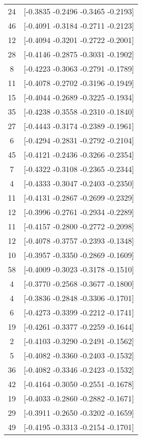 \documentclass[12pt, fullpage,letterpaper]{article}
\begin{document}
\begin{enumerate}
\begin{enumerate}
{\begin{longtable}{|c|c|}
			 24 &  [-0.3835 -0.2496 -0.3465 -0.2193] \\
			 46 &  [-0.4091 -0.3184 -0.2711 -0.2123] \\
			 12 &  [-0.4094 -0.3201 -0.2722 -0.2001] \\
			 28 &  [-0.4146 -0.2875 -0.3031 -0.1902] \\
			  8 &  [-0.4223 -0.3063 -0.2791 -0.1789] \\
			 11 &  [-0.4078 -0.2702 -0.3196 -0.1949] \\
			 15 &  [-0.4044 -0.2689 -0.3225 -0.1934] \\
			 35 &  [-0.4238 -0.3558 -0.2310 -0.1840] \\
			 27 &  [-0.4443 -0.3174 -0.2389 -0.1961] \\
			  6 &  [-0.4294 -0.2831 -0.2792 -0.2104] \\
			 45 &  [-0.4121 -0.2436 -0.3266 -0.2354] \\
			  7 &  [-0.4322 -0.3108 -0.2365 -0.2344] \\
			  4 &  [-0.4333 -0.3047 -0.2403 -0.2350] \\
			 11 &  [-0.4131 -0.2867 -0.2699 -0.2329] \\
			 12 &  [-0.3996 -0.2761 -0.2934 -0.2289] \\
			 11 &  [-0.4157 -0.2800 -0.2772 -0.2098] \\
			 12 &  [-0.4078 -0.3757 -0.2393 -0.1348] \\
			 10 &  [-0.3957 -0.3350 -0.2869 -0.1609] \\
			 58 &  [-0.4009 -0.3023 -0.3178 -0.1510] \\
			  4 &  [-0.3770 -0.2568 -0.3677 -0.1800] \\
			  4 &  [-0.3836 -0.2848 -0.3306 -0.1701] \\
			  6 &  [-0.4273 -0.3399 -0.2212 -0.1741] \\
			 19 &  [-0.4261 -0.3377 -0.2259 -0.1644] \\
			  2 &  [-0.4103 -0.3290 -0.2491 -0.1562] \\
			  5 &  [-0.4082 -0.3360 -0.2403 -0.1532] \\
			 36 &  [-0.4082 -0.3346 -0.2423 -0.1532] \\
			 42 &  [-0.4164 -0.3050 -0.2551 -0.1678] \\
			 19 &  [-0.4033 -0.2860 -0.2882 -0.1671] \\
			 29 &  [-0.3911 -0.2650 -0.3202 -0.1659] \\
			 49 &  [-0.4195 -0.3313 -0.2154 -0.1701] \\

\end{longtable}}
\end{enumerate}
\end{enumerate}
\end{document}

